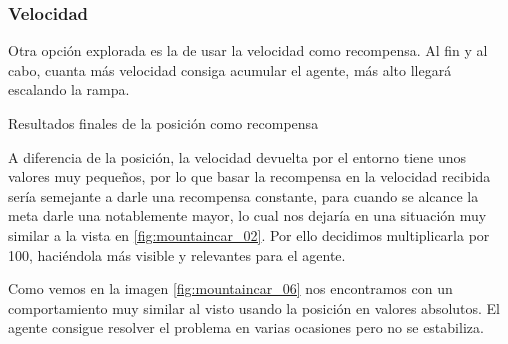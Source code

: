 


\subsubsection*{Velocidad}

Otra opción explorada es la de usar la velocidad como recompensa. Al fin y al cabo, cuanta más velocidad consiga acumular el agente, más alto llegará escalando la rampa.

%
       {Resultados finales de la posición como recompensa}

A diferencia de la posición, la velocidad devuelta por el entorno tiene unos valores muy pequeños, por lo que basar la recompensa en la velocidad recibida sería semejante a darle una recompensa constante, para cuando se alcance la meta darle una notablemente mayor, lo cual nos dejaría en una situación muy similar a la vista en \ref{fig:mountaincar_02}. Por ello decidimos multiplicarla por 100, haciéndola más visible y relevantes para el agente. 

Como vemos en la imagen \ref{fig:mountaincar_06} nos encontramos con un comportamiento muy similar al visto usando la posición en valores absolutos. El agente consigue resolver el problema en varias ocasiones pero no se estabiliza.



